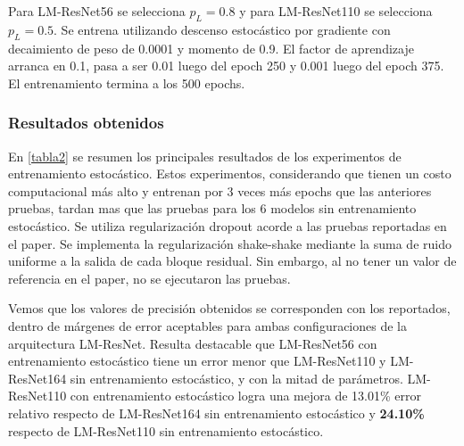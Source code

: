 \documentclass[titlepage,a4paper,oneside]{article}
\begin{document}
Para LM-ResNet56 se selecciona $p_L = 0.8$ y para LM-ResNet110 se selecciona $p_L = 0.5$. Se entrena utilizando descenso estocástico por gradiente con decaimiento de peso de 0.0001 y momento de 0.9. El factor de aprendizaje arranca en 0.1, pasa a ser 0.01 luego del epoch 250 y 0.001 luego del epoch 375. El entrenamiento termina a los 500 epochs.

\subsubsection{Resultados obtenidos}

En \ref{tabla2} se resumen los principales resultados de los experimentos de entrenamiento estocástico. Estos experimentos, considerando que tienen un costo computacional más alto y entrenan por 3 veces más epochs que las anteriores pruebas, tardan mas que las pruebas para los 6 modelos sin entrenamiento estocástico. Se utiliza regularización dropout acorde a las pruebas reportadas en el paper. Se implementa la regularización shake-shake mediante la suma de ruido uniforme a la salida de cada bloque residual. Sin embargo, al no tener un valor de referencia en el paper, no se ejecutaron las pruebas.

Vemos que los valores de precisión obtenidos se corresponden con los reportados, dentro de márgenes de error aceptables para ambas configuraciones de la arquitectura LM-ResNet. Resulta destacable que LM-ResNet56 con entrenamiento estocástico tiene un error menor que LM-ResNet110 y LM-ResNet164 sin entrenamiento estocástico, y con la mitad de parámetros. LM-ResNet110 con entrenamiento estocástico logra una mejora de 13.01\% error relativo respecto de LM-ResNet164 sin entrenamiento estocástico y \textbf{24.10\%} respecto de LM-ResNet110 sin entrenamiento estocástico.
\end{document}
